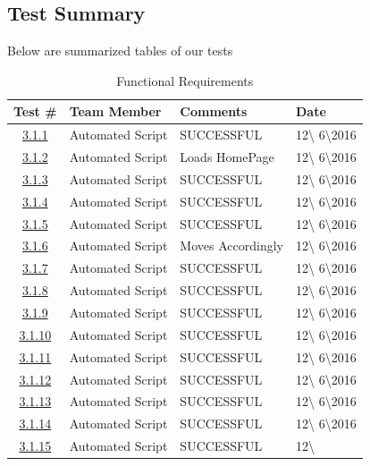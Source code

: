 \documentclass{article}
\begin{document}
\subsection{Test Summary}
Below are summarized tables of our tests
\begin{table}[H]
\caption{Functional Requirements}
	\begin{tabularx}{\textwidth}{| c | l | X | l |}
	\toprule
	Test \#& Team Member &Comments &Date\\
	\midrule
	\hyperref[sec:3.1.1]{3.1.1}& Automated Script  & SUCCESSFUL & 12\textbackslash
	6\textbackslash2016\\
	\hyperref[sec:3.1.2]{3.1.2}& Automated Script  & Loads HomePage & 12\textbackslash
	6\textbackslash2016\\
	\hyperref[sec:3.1.3]{3.1.3}& Automated Script  & SUCCESSFUL & 12\textbackslash
	6\textbackslash2016\\
	\hyperref[sec:3.1.4]{3.1.4}& Automated Script  & SUCCESSFUL & 12\textbackslash
	6\textbackslash2016\\
	\hyperref[sec:3.1.5]{3.1.5}& Automated Script  & SUCCESSFUL & 12\textbackslash
	6\textbackslash2016\\
	\hyperref[sec:3.1.6]{3.1.6}& Automated Script  & Moves Accordingly & 12\textbackslash
	6\textbackslash2016\\
	\hyperref[sec:3.1.7]{3.1.7}& Automated Script  & SUCCESSFUL & 12\textbackslash
	6\textbackslash2016\\
	\hyperref[sec:3.1.8]{3.1.8}& Automated Script  & SUCCESSFUL & 12\textbackslash
	6\textbackslash2016\\
	\hyperref[sec:3.1.9]{3.1.9}& Automated Script  & SUCCESSFUL & 12\textbackslash
	6\textbackslash2016\\
	\hyperref[sec:3.1.10]{3.1.10}& Automated Script  & SUCCESSFUL & 12\textbackslash
	6\textbackslash2016\\
	\hyperref[sec:3.1.11]{3.1.11}& Automated Script  & SUCCESSFUL & 12\textbackslash
	6\textbackslash2016\\
	\hyperref[sec:3.1.12]{3.1.12}& Automated Script  & SUCCESSFUL & 12\textbackslash
	6\textbackslash2016\\
	\hyperref[sec:3.1.3]{3.1.13}& Automated Script  & SUCCESSFUL & 12\textbackslash
	6\textbackslash2016\\
	\hyperref[sec:3.1.4]{3.1.14}& Automated Script  & SUCCESSFUL & 12\textbackslash
	6\textbackslash2016\\
	\hyperref[sec:3.1.5]{3.1.15}& Automated Script  & SUCCESSFUL & 12\textbackslash

\end{tabularx}
\end{table}
\end{document}
